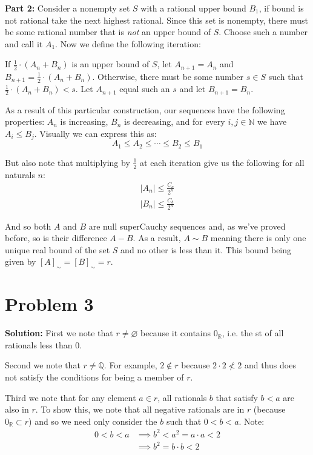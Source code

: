 \documentclass{article}
\begin{document}
\noindent\textbf{Part 2:} Consider a nonempty set $S$ with a rational upper bound $B_1$, if bound is not rational take the next highest rational. Since this set is nonempty, there must be some rational number that is \textit{not} an upper bound of $S$. Choose such a number and call it $A_1$. Now we define the following iteration:

If $\frac{1}{2}\cdot(A_n+B_n)$ is an upper bound of $S$, let $A_{n+1}=A_n$ and $B_{n+1}=\frac{1}{2}\cdot(A_n+B_n)$. Otherwise, there must be some number $s\in S$ such that $\frac{1}{2}\cdot(A_n+B_n)<s$. Let $A_{n+1}$ equal such an $s$ and let $B_{n+1}=B_n$.

As a result of this particular construction, our sequences have the following properties: $A_n$ is increasing, $B_n$ is decreasing, and for every $i,j\in\mathbb N$ we have $A_i\le B_j$. Visually we can express this as:
\begin{equation*}
    A_1\le A_2\le \cdots \le B_2\le B_1
\end{equation*}

But also note that multiplying by $\frac{1}{2}$ at each iteration give us the following for all naturals $n$:
\begin{align*}
    |A_n|\le \frac{C_a}{2^n}\\
    |B_n|\le \frac{C_b}{2^n}
\end{align*}

And so both $A$ and $B$ are null superCauchy sequences and, as we've proved before, so is their difference $A-B$. As a result, $A\sim B$ meaning there is only one unique real bound of the set $S$ and no other is less than it. This bound being given by $[A]_\sim=[B]_\sim=r$.

\section*{Problem 3}
\noindent\textbf{Solution:} First we note that $r\not=\varnothing$ because it contains $0_\mathbb R$, i.e. the st of all rationals less than 0.

Second we note that $r\not=\mathbb Q$. For example, $2\not\in r$ because $2\cdot2\not<2$ and thus does not satisfy the conditions for being a member of $r$.

Third we note that for any element $a\in r$, all rationals $b$ that satisfy $b<a$ are also in $r$. To show this, we note that all negative rationals are in $r$ (because $0_\mathbb R\subset r$) and so we need only consider the $b$ such that $0<b<a$. Note:
\begin{align*}
    0<b<a&\implies b^2<a^2=a\cdot a<2\\
    &\implies b^2=b\cdot b<2\tag{transitive prop.}
\end{align*} 
\end{document}
